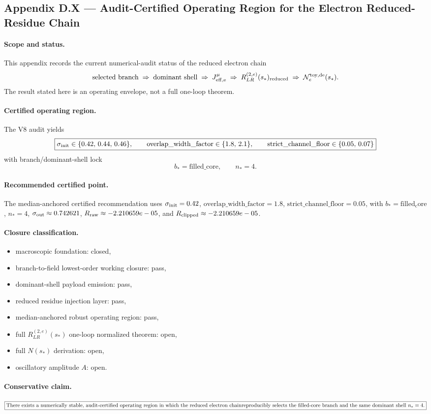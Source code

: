 \subsection*{Appendix D.X --- Audit-Certified Operating Region for the Electron Reduced-Residue Chain}

\paragraph{Scope and status.}
This appendix records the current numerical-audit status of the reduced electron chain
\[
\text{selected branch}
\;\Rightarrow\;
\text{dominant shell}
\;\Rightarrow\;
J^\mu_{\rm eff,e}
\;\Rightarrow\;
R^{(2,e)}_{LR}(s_*)_{\rm reduced}
\;\Rightarrow\;
\mathcal{N}_e^{\rm toy,de}(s_*).
\]
The result stated here is an operating envelope, not a full one-loop theorem.

\paragraph{Certified operating region.}
The V8 audit yields
\[
\boxed{
\sigma_{\rm init} \in \{0.42,\,0.44,\,0.46\},\qquad
\mathrm{overlap\_width\_factor} \in \{1.8,\,2.1\},\qquad
\mathrm{strict\_channel\_floor} \in \{0.05,\,0.07\}
}
\]
with branch/dominant-shell lock
\[
\boxed{b_*=\mathrm{filled\_core},\qquad n_*=4.}
\]

\paragraph{Recommended certified point.}
The median-anchored certified recommendation uses $\sigma_{\rm init}=0.42$, $\mathrm{overlap\_width\_factor}=1.8$, $\mathrm{strict\_channel\_floor}=0.05$, with $b_*=\mathrm{filled_core}$, $n_*=4$, $\sigma_{\rm out}\approx 0.742621$, $R_{\rm raw}\approx -2.210659e-05$, and $R_{\rm clipped}\approx -2.210659e-05$.

\paragraph{Closure classification.}
\begin{itemize}
\item macroscopic foundation: closed,
\item branch-to-field lowest-order working closure: pass,
\item dominant-shell payload emission: pass,
\item reduced residue injection layer: pass,
\item median-anchored robust operating region: pass,
\item full $R^{(2,e)}_{LR}(s_*)$ one-loop normalized theorem: open,
\item full $N(s_*)$ derivation: open,
\item oscillatory amplitude $A$: open.
\end{itemize}

\paragraph{Conservative claim.}
\[
\boxed{
\text{There exists a numerically stable, audit-certified operating region in which the reduced electron chain}
\\
\text{reproducibly selects the filled-core branch and the same dominant shell } n_*=4.
}
\]